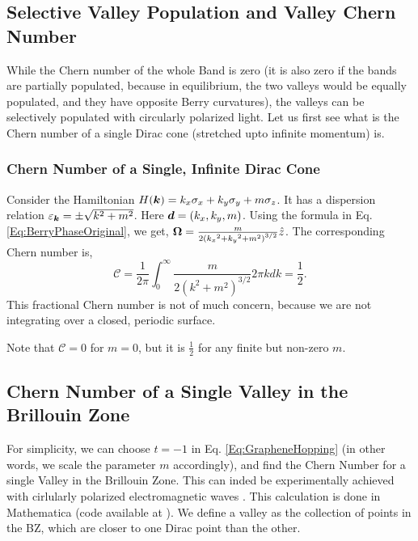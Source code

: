 \documentclass{report}
\renewcommand\vec[1]{\ensuremath\boldsymbol{#1}} %
\begin{document}
\subsection{Selective Valley Population and Valley Chern Number}
While the Chern number of the whole Band is zero (it is also zero if the bands are partially populated, because in equilibrium, the two valleys would be equally populated, and they have opposite Berry curvatures), the valleys can be selectively populated \cite{valleyPolBilayerGraphene} with circularly polarized light.
Let us first see what is the Chern number of a single Dirac cone (stretched upto infinite momentum) is.
\subsubsection{Chern Number of a Single, Infinite Dirac Cone}
Consider the Hamiltonian $H(\vec{k}) = k_x \sigma_x + k_y \sigma_y + m \sigma_z$. It has a dispersion relation $\varepsilon_{\vec{k}} = \pm \sqrt{k^2 + m^2}$. Here $\vec{d} = (k_x, k_y, m)$. Using the formula in Eq. \eqref{Eq:BerryPhaseOriginal}, we get, $\vec{\Omega} = \frac{m}{2\left({k_x}^{2}+{k_y}^{2}+m^{2}\right)^{3 / 2}} \hat{z}$.
The corresponding Chern number is, $$\mathcal{C} = \frac{1}{2\pi} \int_{0}^{\infty} \frac{m}{2\left(k^2+m^{2}\right)^{3 / 2}} 2 \pi k dk = \frac{1}{2}.$$
This fractional Chern number is not of much concern, because we are not integrating over a closed, periodic surface.

Note that $\mathcal{C} = 0$ for $m = 0$, but it is $\frac{1}{2}$ for any finite but non-zero $m$.
\subsection{Chern Number of a Single Valley in the Brillouin Zone}
For simplicity, we can choose $t = -1$ in Eq. \eqref{Eq:GrapheneHopping} (in other words, we scale the parameter $m$ accordingly), and find the Chern Number for a single Valley in the Brillouin Zone. This can inded be experimentally achieved with cirlularly polarized electromagnetic waves \cite{valleyPolBilayerGraphene}. This calculation is done in Mathematica (code available at \cite{code:mathematicaCode}). We define a valley as the collection of points in the BZ, which are closer to one Dirac point than the other.
\end{document}

